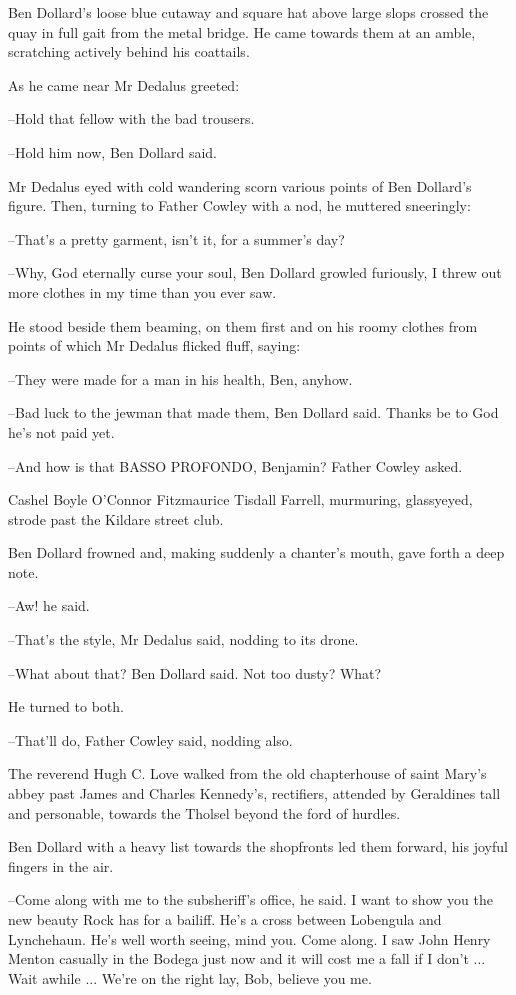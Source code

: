 Ben Dollard's loose blue cutaway and square hat above large slops crossed
the quay in full gait from the metal bridge. He came towards them at an
amble, scratching actively behind his coattails.

As he came near Mr Dedalus greeted:

--Hold that fellow with the bad trousers.

--Hold him now, Ben Dollard said.

Mr Dedalus eyed with cold wandering scorn various points of Ben Dollard's
figure. Then, turning to Father Cowley with a nod, he muttered
sneeringly:

--That's a pretty garment, isn't it, for a summer's day?

--Why, God eternally curse your soul, Ben Dollard growled furiously, I
threw out more clothes in my time than you ever saw.

He stood beside them beaming, on them first and on his roomy clothes from
points of which Mr Dedalus flicked fluff, saying:

--They were made for a man in his health, Ben, anyhow.

--Bad luck to the jewman that made them, Ben Dollard said. Thanks be to
God he's not paid yet.

--And how is that BASSO PROFONDO, Benjamin? Father Cowley asked.

Cashel Boyle O'Connor Fitzmaurice Tisdall Farrell, murmuring, glassyeyed,
strode past the Kildare street club.

Ben Dollard frowned and, making suddenly a chanter's mouth, gave forth a
deep note.

--Aw! he said.

--That's the style, Mr Dedalus said, nodding to its drone.

--What about that? Ben Dollard said. Not too dusty? What?

He turned to both.

--That'll do, Father Cowley said, nodding also.

The reverend Hugh C. Love walked from the old chapterhouse of saint
Mary's abbey past James and Charles Kennedy's, rectifiers, attended by
Geraldines tall and personable, towards the Tholsel beyond the ford of
hurdles.

Ben Dollard with a heavy list towards the shopfronts led them forward,
his joyful fingers in the air.

--Come along with me to the subsheriff's office, he said. I want to show
you the new beauty Rock has for a bailiff. He's a cross between Lobengula
and Lynchehaun. He's well worth seeing, mind you. Come along. I saw John
Henry Menton casually in the Bodega just now and it will cost me a fall
if I don't ... Wait awhile ... We're on the right lay, Bob, believe you
me.

